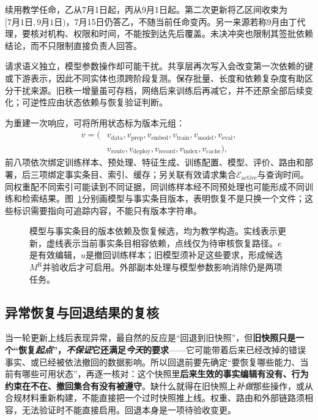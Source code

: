 续用教学任命，乙从7月1日起，丙从9月1日起。第二次更新将乙区间收束为$[\text{7月1日},\text{9月1日})$，7月15日仍答乙，不随当前任命变丙。另一来源若称9月由丁代理，要核对机构、权限和时间，不能按到达先后覆盖。未决冲突也限制其签批依赖结论，而不只限制直接负责人回答。

请求语义独立，模型参数操作却可能干扰。共享层再次写入会改变第一次依赖的键或下游表示，因此不同实体也须跨阶段复测。保存批量、长度和依赖复杂度有助区分干扰来源。旧秩一增量虽可存档，网络后来训练后再减它，并不还原全部后续变化；可逆性应由状态依赖与恢复验证判断。

为重建一次响应，可将所用状态标为版本元组：
\[
\begin{aligned}
v=(&v_{\mathrm{data}},v_{\mathrm{prep}},v_{\mathrm{embed}},
v_{\mathrm{train}},v_{\mathrm{model}},v_{\mathrm{eval}},\\
&v_{\mathrm{route}},v_{\mathrm{deploy}},v_{\mathrm{record}},
v_{\mathrm{index}},v_{\mathrm{cache}}),
\end{aligned}
\]
前八项依次绑定训练样本、预处理、特征生成、训练配置、模型、评价、路由和部署，后三项绑定事实条目、索引、缓存；另关联有效请求集合$\mathcal E_{\mathrm{active}}$与查询时间。同权重配不同索引可能读到不同证据，同训练样本经不同预处理也可能形成不同训练和检索结果。图~\ref{fig:ket-update-versions}分别画模型与事实条目版本，表明恢复不是只换一个文件；这些标识需要指向可追踪内容，不能只有版本字符串。

\begin{figure}[htbp]
\centering

\caption{模型与事实条目的版本依赖及恢复候选，均为教学构造。实线表示更新，虚线表示当前事实条目相容依赖，点线仅为待审核恢复路径。$e$是有效编辑，$u$是撤回训练样本；旧模型须补足这些要求，形成候选$M^{\mathrm R}$并验收后才可启用。外部副本处理与模型参数影响消除仍是两项任务。}
\label{fig:ket-update-versions}
\end{figure}

\FloatBarrier
\subsection{异常恢复与回退结果的复核}
\label{sec:ket-update-rollback}

当一轮更新上线后表现异常，最自然的反应是“回退到旧快照”，但\textbf{旧快照只是一个“恢复\emph{起点}”，\emph{不保证}它还满足\emph{今天}的要求}——它可能带着后来已经改掉的错误事实、或已经被依法撤回的数据影响。所以回退前要先确定“要恢复哪些能力、当前有哪些可用状态”，再逐一核对：这个快照里\textbf{后来生效的事实编辑有没有、行为约束在不在、撤回集合有没有被遵守}。缺什么就得在旧快照上\emph{补做}那些操作，或从合规材料重新构建，不能直接把一个过时快照推上线。权重、路由和外部链路须相容，无法验证时不能直接启用。回退本身是一项待验收变更。

